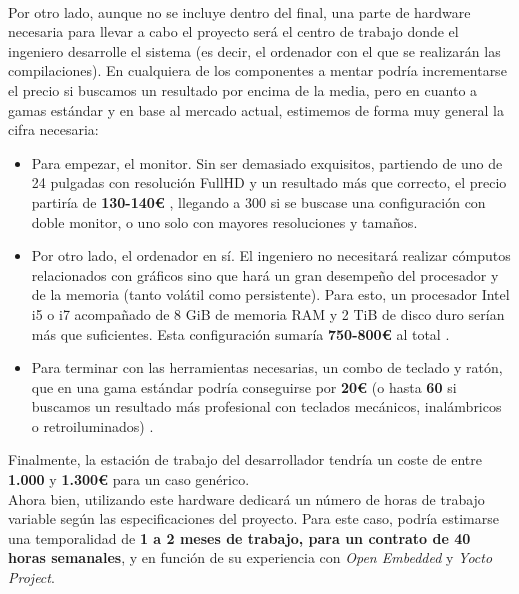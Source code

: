 \noindent\makebox[\linewidth]{\rule{\textwidth}{0.4pt}}\\

Por otro lado, aunque no se incluye dentro del final, una parte de hardware necesaria para llevar a cabo el proyecto será el centro de trabajo donde el ingeniero desarrolle el sistema (es decir, el ordenador con el que se realizarán las compilaciones). En cualquiera de los componentes a mentar podría incrementarse el precio si buscamos un resultado por encima de la media, pero en cuanto a gamas estándar y en base al mercado actual, estimemos de forma muy general la cifra necesaria:

\begin{itemize}
	\item Para empezar, el monitor. Sin ser demasiado exquisitos, partiendo de uno de 24 pulgadas con resolución FullHD y un resultado más que correcto, el precio partiría de \textbf{130-140€} \cite{monitor-samsung-pccom}, llegando a 300 si se buscase una configuración con doble monitor, o uno solo con mayores resoluciones y tamaños.
	\item Por otro lado, el ordenador en sí. El ingeniero no necesitará realizar cómputos relacionados con gráficos sino que hará un gran desempeño del procesador y de la memoria (tanto volátil como persistente). Para esto, un procesador Intel i5 o i7 acompañado de 8 GiB de memoria RAM y 2 TiB de disco duro serían más que suficientes. Esta configuración sumaría \textbf{750-800€} al total \cite{ordenador-sobremesa-pccom}.
	\item Para terminar con las herramientas necesarias, un combo de teclado y ratón, que en una gama estándar podría conseguirse por \textbf{20€} (o hasta \textbf{60} si buscamos un resultado más profesional con teclados mecánicos, inalámbricos o retroiluminados) \cite{combo-teclado-logitech-pccom}.
\end{itemize}

Finalmente, la estación de trabajo del desarrollador tendría un coste de entre \textbf{1.000} y \textbf{1.300€} para un caso genérico.\\

Ahora bien, utilizando este hardware dedicará un número de horas de trabajo variable según las especificaciones del proyecto. Para este caso, podría estimarse una temporalidad de \textbf{1 a 2 meses de trabajo, para un contrato de 40 horas semanales}, y en función de su experiencia con \textit{Open Embedded} y \textit{Yocto Project}.\\

